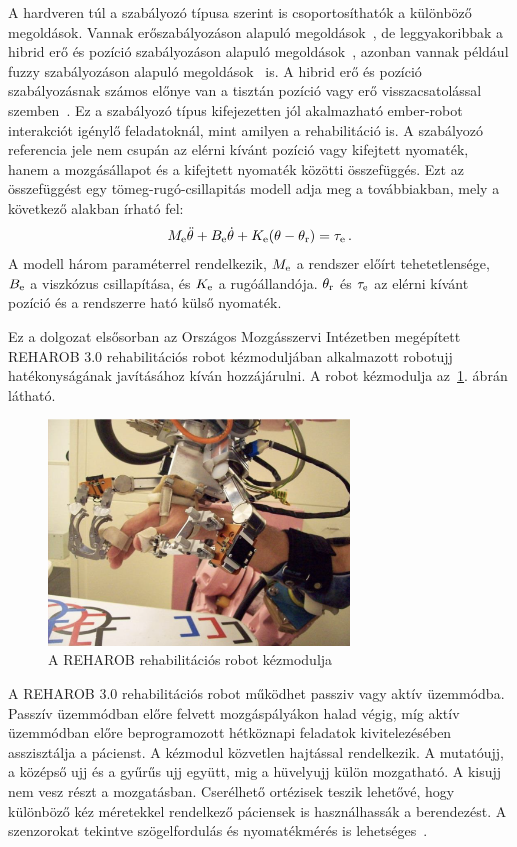 A hardveren túl a szabályozó típusa szerint is csoportosíthatók a különböző megoldások. Vannak erőszabályozáson 
alapuló megoldások~\cite{kovacs2003dynamics}, de leggyakoribbak a hibrid erő és 
pozíció szabályozáson alapuló megoldások~\cite{Hua2019,Xie2021}, azonban vannak például fuzzy szabályozáson alapuló megoldások~\cite{Hu2023} is.
A hibrid erő és pozíció szabályozásnak számos előnye van a tisztán pozíció vagy erő visszacsatolással 
szemben~\cite{hogan1984Impedance,hogan1985ImpedancePART1,hogan1985ImpedancePART2,hogan1985ImpedancePART3,kovacs2003dynamics,stepan2001vibrations}.
Ez a szabályozó típus kifejezetten jól akalmazható ember-robot interakciót igénylő feladatoknál, mint amilyen 
a rehabilitáció is. A szabályozó referencia jele nem csupán 
az elérni kívánt pozíció vagy kifejtett nyomaték, hanem a mozgásállapot és a kifejtett
nyomaték közötti összefüggés. Ezt az összefüggést egy 
tömeg-rugó-csillapitás modell adja meg a továbbiakban, mely a következő alakban
írható fel: 
\begin{align}
    M_{\mathrm{e}} \ddot \theta + B_{\mathrm{e}} \dot \theta + K_{\mathrm{e}} (\theta - \theta_{\mathrm{r}}) = \tau_{\mathrm{e}}\,.
\end{align}
A modell három paraméterrel rendelkezik, $M_{\mathrm{e}}$ a rendszer előírt tehetetlensége, 
$B_{\mathrm{e}}$ a viszkózus csillapítása, és $K_{\mathrm{e}}$ a rugóállandója. 
$\theta_{\mathrm{r}}$ és $\tau_{\mathrm{e}}$ az elérni kívánt pozíció és a rendszerre ható külső nyomaték. 

Ez a dolgozat elsősorban az Országos Mozgásszervi Intézetben megépített REHAROB 3.0 
rehabilitációs robot kézmoduljában alkalmazott robotujj hatékonyságának javításához kíván hozzájárulni.
A robot kézmodulja az~\ref{fig:reharob_hand_module}. ábrán látható.
\begin{figure}[H]
    \begin{center}
    \includegraphics[width=8cm]{images/reharob_hand_module.png}
    \caption{A REHAROB rehabilitációs robot kézmodulja}\label{fig:reharob_hand_module}
    \end{center}
\end{figure}
A REHAROB 3.0 rehabilitációs robot működhet passziv vagy aktív üzemmódba. Passzív üzemmódban előre felvett 
mozgáspályákon halad végig, míg aktív üzemmódban előre beprogramozott hétköznapi feladatok 
kivitelezésében asszisztálja a pácienst. A kézmodul közvetlen hajtással rendelkezik. A mutatóujj, a középső ujj és a
gyűrűs ujj együtt, mig a hüvelyujj külön mozgatható. A kisujj nem vesz részt a mozgatásban. Cserélhető ortézisek 
teszik lehetővé, hogy különböző kéz méretekkel rendelkező páciensek is használhassák a berendezést. A szenzorokat 
tekintve szögelfordulás és nyomatékmérés is lehetséges~\cite{Bauer2021}.

